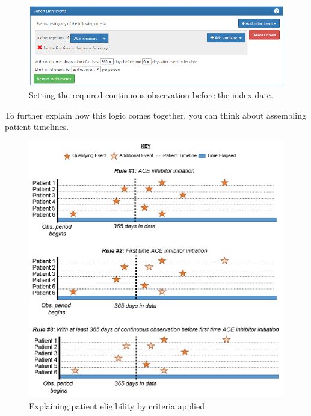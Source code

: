 \documentclass[11pt]{book}
\theoremstyle{definition}
\theoremstyle{definition}
\theoremstyle{definition}
\theoremstyle{remark}
\begin{document}
\begin{figure}

{\centering \includegraphics[width=1\linewidth]{images/Cohorts/initialEventAce} 

}

\caption{Setting the required continuous observation before the index date.}\label{fig:initialEventAce}
\end{figure}

To further explain how this logic comes together, you can think about assembling patient timelines.

\begin{figure}

{\centering \includegraphics[width=1\linewidth]{images/Cohorts/EarliestEventExplained} 

}

\caption{Explaining patient eligibility by criteria applied}\label{fig:EarliestEventExplained}
\end{figure}
\end{document}
